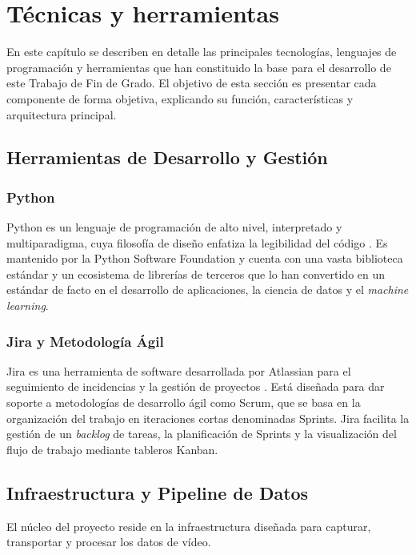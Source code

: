 \chapter{Técnicas y herramientas}
\label{chap:tecnicas_herramientas}

En este capítulo se describen en detalle las principales tecnologías, lenguajes de programación y herramientas que han constituido la base para el desarrollo de este Trabajo de Fin de Grado. El objetivo de esta sección es presentar cada componente de forma objetiva, explicando su función, características y arquitectura principal.

\section{Herramientas de Desarrollo y Gestión}
\label{sec:herramientas_desarrollo}

\subsection{Python}
Python es un lenguaje de programación de alto nivel, interpretado y multiparadigma, cuya filosofía de diseño enfatiza la legibilidad del código \cite{python_software_foundation}. Es mantenido por la Python Software Foundation y cuenta con una vasta biblioteca estándar y un ecosistema de librerías de terceros que lo han convertido en un estándar de facto en el desarrollo de aplicaciones, la ciencia de datos y el \textit{machine learning}.

\subsection{Jira y Metodología Ágil}
Jira es una herramienta de software desarrollada por Atlassian para el seguimiento de incidencias y la gestión de proyectos \cite{atlassian_jira}. Está diseñada para dar soporte a metodologías de desarrollo ágil como Scrum, que se basa en la organización del trabajo en iteraciones cortas denominadas Sprints. Jira facilita la gestión de un \textit{backlog} de tareas, la planificación de Sprints y la visualización del flujo de trabajo mediante tableros Kanban.

\section{Infraestructura y Pipeline de Datos}
\label{sec:herramientas_infraestructura}
El núcleo del proyecto reside en la infraestructura diseñada para capturar, transportar y procesar los datos de vídeo.

